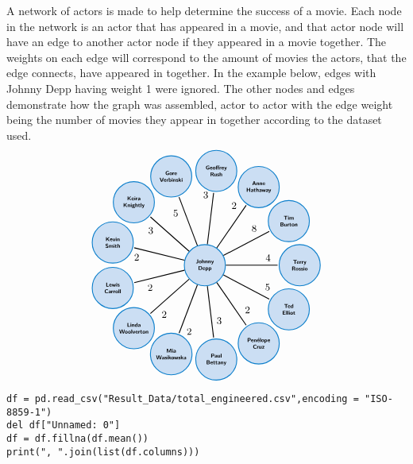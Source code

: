 \documentclass{article}
\begin{document}
A network of actors is made to help determine the success of a
movie. Each node in the network is an actor that has appeared in a
movie, and that actor node will have an edge to another actor node if
they appeared in a movie together. The weights on each edge will
correspond to the amount of movies the actors, that the edge connects,
have appeared in together. In the example below, edges with Johnny Depp having weight 1 were ignored. The other nodes and edges demonstrate how the graph was assembled, actor to actor with the edge weight being the number of movies they appear in together according to the dataset used.
\[
\begin{tikzpicture}[shorten >=1pt,thick]

\foreach [count=\i] \a/\t/\d in {2/Anne\\Hathaway/3, 3/Geoffrey\\Rush/3, 4/Gore\\Verbinski/3, 5/Keira\\Knightly/3, 6/Kevin\\Smith/3, 7/Lewis\\Carroll/3, 8/Linda\\Woolverton/3, 9/Mia\\Wasikowska/3, 10/Paul\\Bettany/3, 11/Penélope\\Cruz/3, 12/Ted\\Elliot/3, 13/Terry\\Rossio/3, 1/Tim\\Burton/3, 0/Johnny\\Depp/0}
\draw (\a*360/13: \d cm) node[circle,draw=blue,fill=blue!20!,font=\sffamily\tiny\bfseries,align=center,minimum size=1.3cm] (v\i)  {\t};

\foreach \i/\j/\w in {14/1/2,14/2/3,14/3/5,14/4/3,14/5/2,14/6/2,14/7/2,14/8/2,14/9/3,14/10/2,14/11/5,14/12/4,14/13/8}
\draw [black,thick]  (v\i) edge node [font=\small,pos=.8,auto] {\w} (v\j);


\end{tikzpicture}
\]


\begin{lstlisting}
df = pd.read_csv("Result_Data/total_engineered.csv",encoding = "ISO-8859-1")
del df["Unnamed: 0"]
df = df.fillna(df.mean())
print(", ".join(list(df.columns)))
\end{lstlisting}
\end{document}

